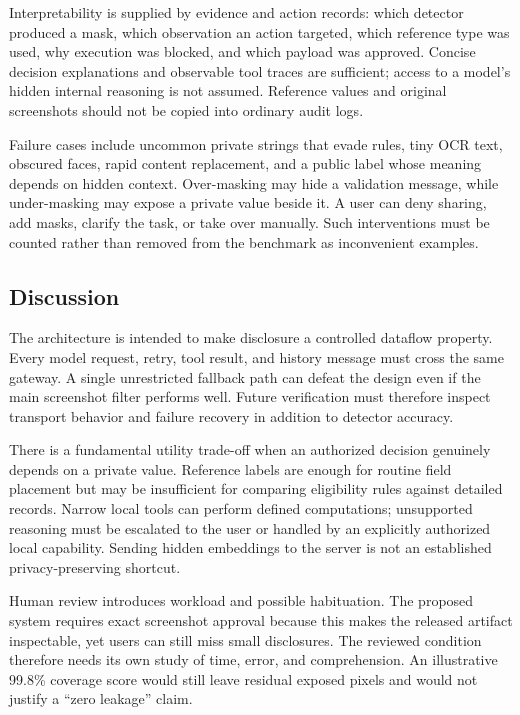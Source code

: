 \documentclass[conference]{IEEEtran}
\begin{document}
Interpretability is supplied by evidence and action records: which detector produced a mask, which observation an action targeted, which reference type was used, why execution was blocked, and which payload was approved. Concise decision explanations and observable tool traces are sufficient; access to a model's hidden internal reasoning is not assumed. Reference values and original screenshots should not be copied into ordinary audit logs.

Failure cases include uncommon private strings that evade rules, tiny OCR text, obscured faces, rapid content replacement, and a public label whose meaning depends on hidden context. Over-masking may hide a validation message, while under-masking may expose a private value beside it. A user can deny sharing, add masks, clarify the task, or take over manually. Such interventions must be counted rather than removed from the benchmark as inconvenient examples.

\subsection{Discussion}
The architecture is intended to make disclosure a controlled dataflow property. Every model request, retry, tool result, and history message must cross the same gateway. A single unrestricted fallback path can defeat the design even if the main screenshot filter performs well. Future verification must therefore inspect transport behavior and failure recovery in addition to detector accuracy.

There is a fundamental utility trade-off when an authorized decision genuinely depends on a private value. Reference labels are enough for routine field placement but may be insufficient for comparing eligibility rules against detailed records. Narrow local tools can perform defined computations; unsupported reasoning must be escalated to the user or handled by an explicitly authorized local capability. Sending hidden embeddings to the server is not an established privacy-preserving shortcut.

Human review introduces workload and possible habituation. The proposed system requires exact screenshot approval because this makes the released artifact inspectable, yet users can still miss small disclosures. The reviewed condition therefore needs its own study of time, error, and comprehension. An illustrative 99.8\% coverage score would still leave residual exposed pixels and would not justify a ``zero leakage'' claim.
\end{document}
